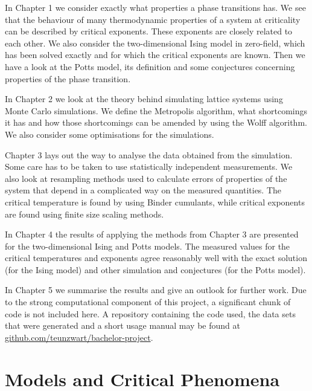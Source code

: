 \documentclass[11pt, a4paper]{report} %
\begin{document}
In Chapter 1 we consider exactly what properties a phase transitions has.
We see that the behaviour of many thermodynamic properties of a system at criticality can be described by critical exponents.
These exponents are closely related to each other.
We also consider the two-dimensional Ising model in zero-field, which has been solved exactly and for which the critical exponents are known.
Then we have a look at the Potts model, its definition and some conjectures concerning properties of the phase transition.

In Chapter 2 we look at the theory behind simulating lattice systems using Monte Carlo simulations.
We define the Metropolis algorithm, what shortcomings it has and how those shortcomings can be amended by using the Wolff algorithm.
We also consider some optimisations for the simulations.

Chapter 3 lays out the way to analyse the data obtained from the simulation.
Some care has to be taken to use statistically independent measurements.
We also look at resampling methods used to calculate errors of properties of the system that depend in a complicated way on the measured quantities.
The critical temperature is found by using Binder cumulants, while critical exponents are found using finite size scaling methods.

In Chapter 4 the results of applying the methods from Chapter 3 are presented for the two-dimensional Ising and Potts models.
The measured values for the critical temperatures and exponents agree reasonably well with the exact solution (for the Ising model) and other simulation and conjectures (for the Potts model).

In Chapter 5 we summarise the results and give an outlook for further work.
Due to the strong computational component of this project, a significant chunk of code is not included here.
A repository containing the code used, the data sets that were generated and a short usage manual may be found at \url{github.com/teunzwart/bachelor-project}.


\chapter{Models and Critical Phenomena}
\end{document}
